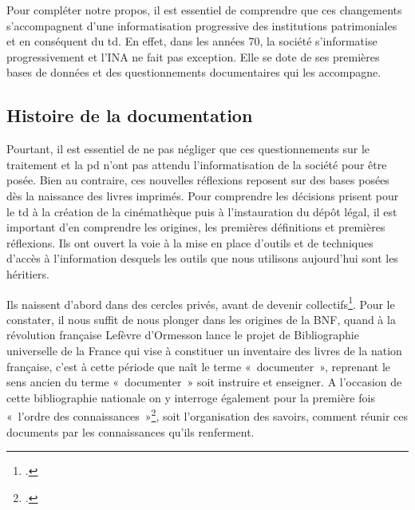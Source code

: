 
Pour compléter notre propos, il est essentiel de comprendre que ces changements s'accompagnent d'une informatisation progressive des institutions patrimoniales et en conséquent du \gls{td}. En effet, dans les années 70, la société s’informatise progressivement et l’INA ne fait pas exception. Elle se dote de ses premières bases de données et des questionnements documentaires qui les accompagne. 

\subsection{Histoire de la documentation}


Pourtant, il est essentiel de ne pas négliger que ces questionnements sur le traitement et la \gls{pd} n’ont pas attendu l’informatisation de la société pour être posée. Bien au contraire, ces nouvelles réflexions reposent sur des bases posées dès la naissance des livres imprimés. Pour comprendre les décisions prisent pour le \gls{td} à la création de la cinémathèque puis à l'instauration du dépôt légal, il est important d'en comprendre les origines, les premières définitions et premières réflexions. Ils ont ouvert la voie à la mise en place d’outils et de techniques d’accès à l’information desquels les outils que nous utilisons aujourd'hui sont les héritiers. 


Ils naissent d’abord dans des cercles privés, avant de devenir collectifs\footcite[][15]{fayet-scribe2000}. Pour le constater, il nous suffit de nous plonger dans les origines de la BNF, quand à la révolution française Lefèvre d’Ormesson lance le projet de Bibliographie universelle de la France qui vise à constituer un inventaire des livres de la nation française, c’est à cette période que naît le terme « documenter », reprenant le sens ancien du terme « documenter » soit instruire et enseigner. A l’occasion de cette bibliographie nationale on y interroge également pour la première fois « l’ordre des connaissances »\footcite[][21-22]{fayet-scribe2000}, soit l’organisation des savoirs, comment réunir ces documents par les connaissances qu'ils renferment. 


